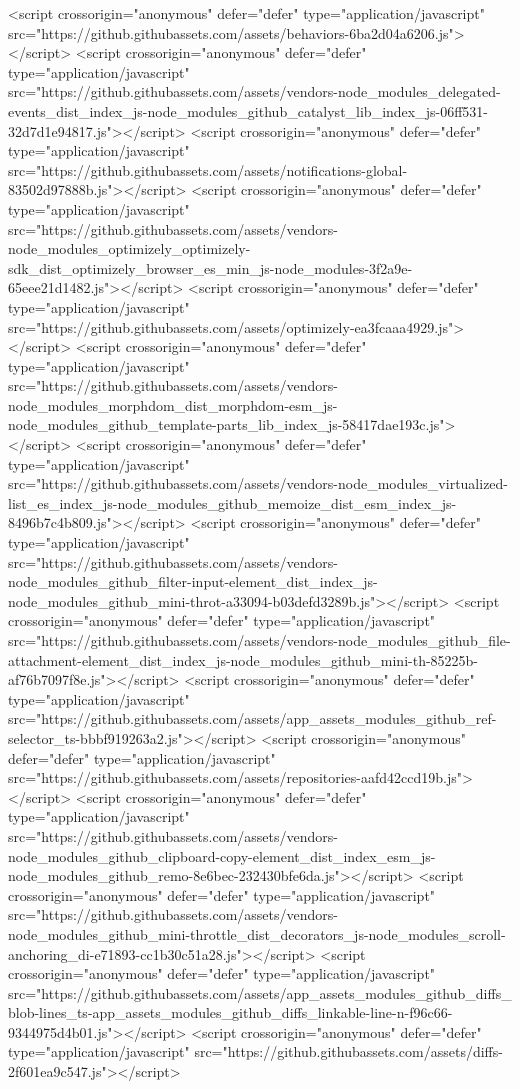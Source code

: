 <script crossorigin="anonymous" defer="defer" type="application/javascript" src="https://github.githubassets.com/assets/behaviors-6ba2d04a6206.js"></script>
<script crossorigin="anonymous" defer="defer" type="application/javascript" src="https://github.githubassets.com/assets/vendors-node_modules_delegated-events_dist_index_js-node_modules_github_catalyst_lib_index_js-06ff531-32d7d1e94817.js"></script>
<script crossorigin="anonymous" defer="defer" type="application/javascript" src="https://github.githubassets.com/assets/notifications-global-83502d97888b.js"></script>
<script crossorigin="anonymous" defer="defer" type="application/javascript" src="https://github.githubassets.com/assets/vendors-node_modules_optimizely_optimizely-sdk_dist_optimizely_browser_es_min_js-node_modules-3f2a9e-65eee21d1482.js"></script>
<script crossorigin="anonymous" defer="defer" type="application/javascript" src="https://github.githubassets.com/assets/optimizely-ea3fcaaa4929.js"></script>
<script crossorigin="anonymous" defer="defer" type="application/javascript" src="https://github.githubassets.com/assets/vendors-node_modules_morphdom_dist_morphdom-esm_js-node_modules_github_template-parts_lib_index_js-58417dae193c.js"></script>
<script crossorigin="anonymous" defer="defer" type="application/javascript" src="https://github.githubassets.com/assets/vendors-node_modules_virtualized-list_es_index_js-node_modules_github_memoize_dist_esm_index_js-8496b7c4b809.js"></script>
<script crossorigin="anonymous" defer="defer" type="application/javascript" src="https://github.githubassets.com/assets/vendors-node_modules_github_filter-input-element_dist_index_js-node_modules_github_mini-throt-a33094-b03defd3289b.js"></script>
<script crossorigin="anonymous" defer="defer" type="application/javascript" src="https://github.githubassets.com/assets/vendors-node_modules_github_file-attachment-element_dist_index_js-node_modules_github_mini-th-85225b-af76b7097f8e.js"></script>
<script crossorigin="anonymous" defer="defer" type="application/javascript" src="https://github.githubassets.com/assets/app_assets_modules_github_ref-selector_ts-bbbf919263a2.js"></script>
<script crossorigin="anonymous" defer="defer" type="application/javascript" src="https://github.githubassets.com/assets/repositories-aafd42ccd19b.js"></script>
<script crossorigin="anonymous" defer="defer" type="application/javascript" src="https://github.githubassets.com/assets/vendors-node_modules_github_clipboard-copy-element_dist_index_esm_js-node_modules_github_remo-8e6bec-232430bfe6da.js"></script>
<script crossorigin="anonymous" defer="defer" type="application/javascript" src="https://github.githubassets.com/assets/vendors-node_modules_github_mini-throttle_dist_decorators_js-node_modules_scroll-anchoring_di-e71893-cc1b30c51a28.js"></script>
<script crossorigin="anonymous" defer="defer" type="application/javascript" src="https://github.githubassets.com/assets/app_assets_modules_github_diffs_blob-lines_ts-app_assets_modules_github_diffs_linkable-line-n-f96c66-9344975d4b01.js"></script>
<script crossorigin="anonymous" defer="defer" type="application/javascript" src="https://github.githubassets.com/assets/diffs-2f601ea9c547.js"></script>
  

